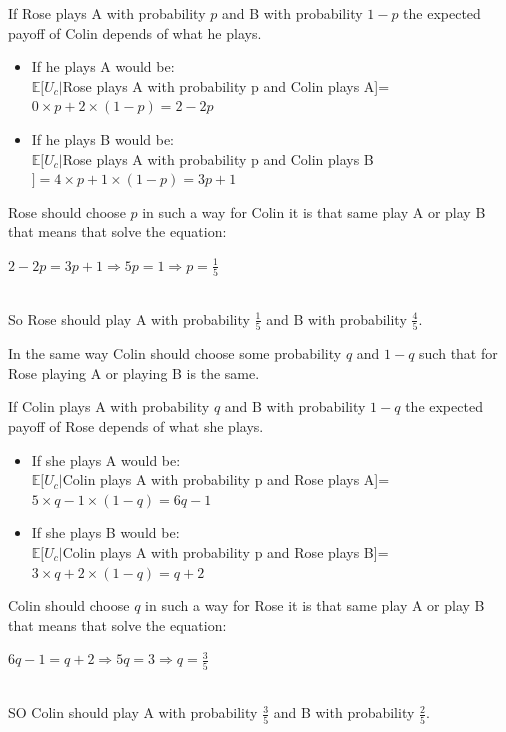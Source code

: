 \documentclass{article}
\begin{document}
If Rose plays A with probability $p$ and B with probability $1-p$ the expected payoff of Colin depends of what he plays.
\begin{itemize}
	\item If he plays A would be: 
	\newline\\
	$\mathbb{E}[U_c|$Rose plays A with probability p and Colin plays A]=$0 \times p + 2 \times (1-p) = 2-2p$ 
	\item If he plays B would be: 
	\newline\\
	$\mathbb{E}[U_c|$Rose plays A with probability p and Colin plays B$]=4 \times p + 1 \times (1-p)= 3p +1$ 
\end{itemize}
\pagebreak Rose should choose $p$ in such a way for Colin it is that same play A or play B that means that solve the equation:\\

\centerline{$2 - 2p = 3p + 1 \Longrightarrow 5p = 1 \Longrightarrow p=\frac{1}{5}$} \mbox{}\\
So Rose should play A with probability $\frac{1}{5}$ and B with probability $\frac{4}{5}$.

In the same way Colin should choose some probability $q$ and $1-q$ such that for Rose playing A or playing B is the same.

If Colin plays A with probability $q$ and B with probability $1-q$ the expected payoff of Rose depends of what she plays.
\begin{itemize}
	\item If she plays A would be: 
	\newline\\
	$\mathbb{E}[U_c|$Colin plays A with probability p and Rose plays A]=$5 \times q - 1 \times (1-q) = 6q-1$ 
	\item If she plays B would be: 
	\newline\\
	$\mathbb{E}[U_c|$Colin plays A with probability p and Rose plays B]=$3 \times q + 2 \times (1-q)= q + 2$ 
\end{itemize}
Colin should choose $q$ in such a way for Rose it is that same play A or play B that means that solve the equation:\\

\centerline{$6q-1 = q + 2 \Longrightarrow 5q = 3 \Longrightarrow q=\frac{3}{5}$} \mbox{}\\
SO Colin should play A with probability $\frac{3}{5}$ and B with probability $\frac{2}{5}$.
\end{document}
